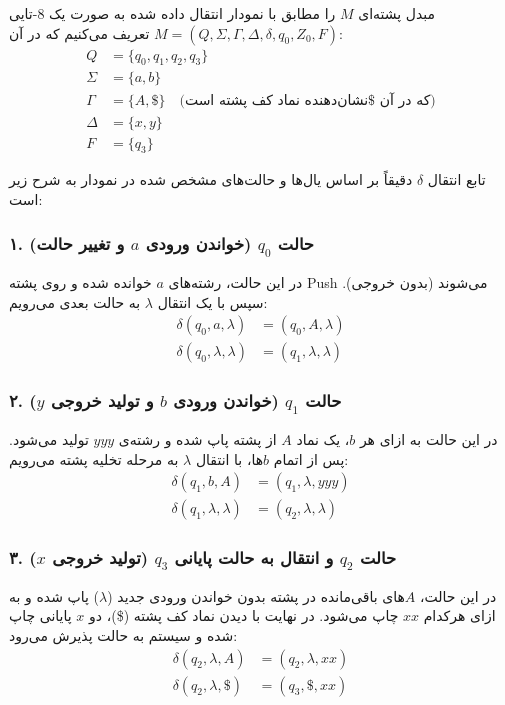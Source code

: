 مبدل پشته‌ای $M$ را مطابق با نمودار انتقال داده شده به صورت یک $8$-تایی $M = (Q, \Sigma, \Gamma, \Delta, \delta, q_0, Z_0, F)$ تعریف می‌کنیم که در آن:
\begin{align*}
    Q &= \{q_0, q_1, q_2, q_3\} \\
    \Sigma &= \{a, b\} \\
    \Gamma &= \{A, \$\} \quad \text{(که در آن \$ نشان‌دهنده نماد کف پشته است)} \\
    \Delta &= \{x, y\} \\
    F &= \{q_3\}
\end{align*}

تابع انتقال $\delta$ دقیقاً بر اساس یال‌ها و حالت‌های مشخص شده در نمودار به شرح زیر است:

\subsubsection*{۱. حالت $q_0$ (خواندن ورودی $a$ و تغییر حالت)}
در این حالت، رشته‌های $a$ خوانده شده و روی پشته Push می‌شوند (بدون خروجی). سپس با یک انتقال $\lambda$ به حالت بعدی می‌رویم:
\begin{align*}
    \delta(q_0, a, \lambda) &= (q_0, A, \lambda) \\
    \delta(q_0, \lambda, \lambda) &= (q_1, \lambda, \lambda)
\end{align*}

\subsubsection*{۲. حالت $q_1$ (خواندن ورودی $b$ و تولید خروجی $y$)}
در این حالت به ازای هر $b$، یک نماد $A$ از پشته پاپ شده و رشته‌ی $yyy$ تولید می‌شود. پس از اتمام $b$ها، با انتقال $\lambda$ به مرحله تخلیه پشته می‌رویم:
\begin{align*}
    \delta(q_1, b, A) &= (q_1, \lambda, yyy) \\
    \delta(q_1, \lambda, \lambda) &= (q_2, \lambda, \lambda)
\end{align*}

\subsubsection*{۳. حالت $q_2$ و انتقال به حالت پایانی $q_3$ (تولید خروجی $x$)}
در این حالت، $A$های باقی‌مانده در پشته بدون خواندن ورودی جدید ($\lambda$) پاپ شده و به ازای هرکدام $xx$ چاپ می‌شود. در نهایت با دیدن نماد کف پشته (\$)، دو $x$ پایانی چاپ شده و سیستم به حالت پذیرش می‌رود:
\begin{align*}
    \delta(q_2, \lambda, A) &= (q_2, \lambda, xx) \\
    \delta(q_2, \lambda, \$) &= (q_3, \$, xx)
\end{align*}



